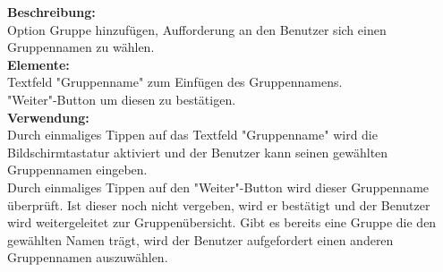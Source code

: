 \textbf{Beschreibung:}\\
Option Gruppe hinzufügen, Aufforderung an den Benutzer sich einen Gruppennamen zu wählen.\\
\textbf{Elemente:}\\
Textfeld "Gruppenname" zum Einfügen des Gruppennamens.\\
"Weiter"-Button um diesen zu bestätigen.\\
\textbf{Verwendung:}\\
Durch einmaliges Tippen auf das Textfeld "Gruppenname" wird die Bildschirmtastatur aktiviert und der Benutzer kann seinen gewählten Gruppennamen eingeben.\\
Durch einmaliges Tippen auf den "Weiter"-Button wird dieser Gruppenname überprüft. Ist dieser noch nicht vergeben, wird er bestätigt und der Benutzer wird weitergeleitet zur Gruppenübersicht. Gibt es bereits eine Gruppe die den gewählten Namen trägt, wird der Benutzer aufgefordert einen anderen Gruppennamen auszuwählen.
\clearpage
\newpage

